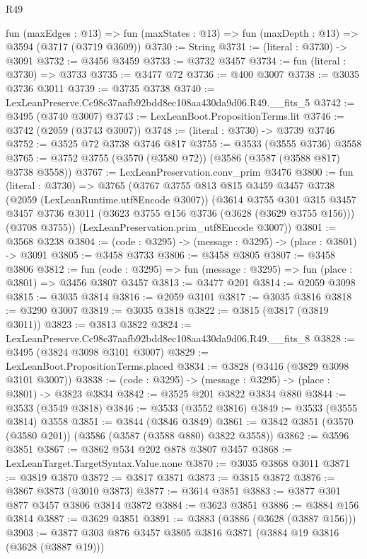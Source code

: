 \begin{lexlean}{R49}
\begin{coremodule}
  fun (maxEdges : @13) =>
  fun (maxStates : @13) => fun (maxDepth : @13) => @3594 (@3717 (@3719 @3609))
@3730 := String
@3731 := (literal : @3730) -> @3091
@3732 := @3456 @3459
@3733 := @3732 @3457
@3734 := fun (literal : @3730) => @3733
@3735 := @3477 @72
@3736 := @400 @3007
@3738 := @3035 @3736 @3011
@3739 := @3735 @3738
@3740 := LexLeanPreserve.Cc98c37aafb92bdd8ec108aa430da9d06.R49.__fits_5
@3742 := @3495 (@3740 @3007)
@3743 := LexLeanBoot.PropositionTerms.lit
@3746 := @3742 (@2059 (@3743 @3007))
@3748 := (literal : @3730) -> @3739 @3746
@3752 := @3525 @72 @3738 @3746 @817
@3755 := @3533 (@3555 @3736) @3558
@3765 := @3752 @3755 (@3570 (@3580 @72)) (@3586 (@3587 (@3588 @817) @3738 @3558))
@3767 := LexLeanPreservation.conv_prim @3476
@3800 := fun (literal : @3730) =>
  @3765
    (@3767
      @3755
      @813
      @815
      @3459
      @3457
      @3738
      (@2059 (LexLeanRuntime.utf8Encode @3007))
      (@3614
        @3755
        @301
        @315
        @3457
        @3457
        @3736
        @3011
        (@3623 @3755 @156 @3736 (@3628 (@3629 @3755 @156)))
        (@3708 @3755))
      (LexLeanPreservation.prim_utf8Encode @3007))
@3801 := @3568 @3238
@3804 := (code : @3295) -> (message : @3295) -> (place : @3801) -> @3091
@3805 := @3458 @3733
@3806 := @3458 @3805
@3807 := @3458 @3806
@3812 := fun (code : @3295) => fun (message : @3295) => fun (place : @3801) => @3456 @3807 @3457
@3813 := @3477 @201
@3814 := @2059 @3098
@3815 := @3035 @3814
@3816 := @2059 @3101
@3817 := @3035 @3816
@3818 := @3290 @3007
@3819 := @3035 @3818
@3822 := @3815 (@3817 (@3819 @3011))
@3823 := @3813 @3822
@3824 := LexLeanPreserve.Cc98c37aafb92bdd8ec108aa430da9d06.R49.__fits_8
@3828 := @3495 (@3824 @3098 @3101 @3007)
@3829 := LexLeanBoot.PropositionTerms.placed
@3834 := @3828 (@3416 (@3829 @3098 @3101 @3007))
@3838 := (code : @3295) -> (message : @3295) -> (place : @3801) -> @3823 @3834
@3842 := @3525 @201 @3822 @3834 @880
@3844 := @3533 (@3549 @3818)
@3846 := @3533 (@3552 @3816)
@3849 := @3533 (@3555 @3814) @3558
@3851 := @3844 (@3846 @3849)
@3861 := @3842 @3851 (@3570 (@3580 @201)) (@3586 (@3587 (@3588 @880) @3822 @3558))
@3862 := @3596 @3851
@3867 := @3862 @534 @202 @878 @3807 @3457
@3868 := LexLeanTarget.TargetSyntax.Value.none
@3870 := @3035 @3868 @3011
@3871 := @3819 @3870
@3872 := @3817 @3871
@3873 := @3815 @3872
@3876 := @3867 @3873 (@3010 @3873)
@3877 := @3614 @3851
@3883 := @3877 @301 @877 @3457 @3806 @3814 @3872
@3884 := @3623 @3851
@3886 := @3884 @156 @3814
@3887 := @3629 @3851
@3891 := @3883 (@3886 (@3628 (@3887 @156)))
@3903 := @3877 @303 @876 @3457 @3805 @3816 @3871 (@3884 @19 @3816 (@3628 (@3887 @19)))

\end{coremodule}
\end{lexlean}
